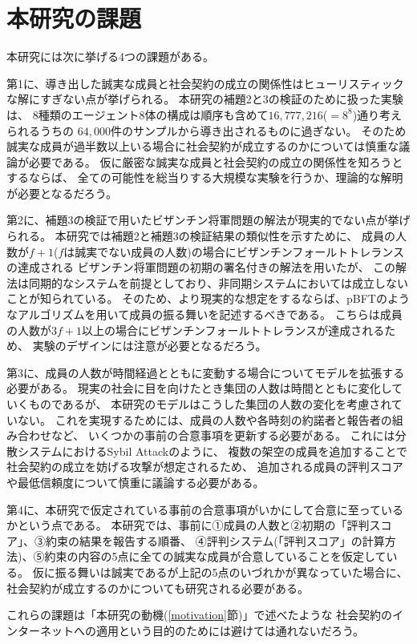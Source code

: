 \section{本研究の課題}
本研究には次に挙げる4つの課題がある。

第1に、導き出した誠実な成員と社会契約の成立の関係性はヒューリスティックな解にすぎない点が挙げられる。
本研究の補題2と3の検証のために扱った実験は、
8種類のエージェント8体の構成は順序も含めて$16,777,216$($=8^8$)通り考えられるうちの
$64,000$件のサンプルから導き出されるものに過ぎない。
そのため誠実な成員が過半数以上いる場合に社会契約が成立するのかについては慎重な議論が必要である。
仮に厳密な誠実な成員と社会契約の成立の関係性を知ろうとするならば、
全ての可能性を総当りする大規模な実験を行うか、理論的な解明が必要となるだろう。

第2に、補題3の検証で用いたビザンチン将軍問題の解法が現実的でない点が挙げられる。
本研究では補題2と補題3の検証結果の類似性を示すために、
成員の人数が$f+1$($f$は誠実でない成員の人数)の場合にビザンチンフォールトトレランスの達成される
ビザンチン将軍問題の初期の署名付きの解法\cite{lamport1982}を用いたが、
この解法は同期的なシステムを前提としており、非同期システムにおいては成立しないことが知られている。\cite{fischer1985}
そのため、より現実的な想定をするならば、pBFTのようなアルゴリズムを用いて成員の振る舞いを記述するべきである。\cite{castro1999}
こちらは成員の人数が$3f+1$以上の場合にビザンチンフォールトトレランスが達成されるため、
実験のデザインには注意が必要となるだろう。

第3に、成員の人数が時間経過とともに変動する場合についてモデルを拡張する必要がある。
現実の社会に目を向けたとき集団の人数は時間とともに変化していくものであるが、
本研究のモデルはこうした集団の人数の変化を考慮されていない。
これを実現するためには、成員の人数や各時刻の約諾者と報告者の組み合わせなど、
いくつかの事前の合意事項を更新する必要がある。
これには分散システムにおけるSybil Attack\cite{douceur2002}のように、
複数の架空の成員を追加することで社会契約の成立を妨げる攻撃が想定されるため、
追加される成員の評判スコアや最低信頼度について慎重に議論する必要がある。

第4に、本研究で仮定されている事前の合意事項がいかにして合意に至っているかという点である。
本研究では、事前に①成員の人数と②初期の「評判スコア」、③約束の結果を報告する順番、
④評判システム(「評判スコア」の計算方法)、⑤約束の内容の5点に全ての誠実な成員が合意していることを仮定している。
仮に振る舞いは誠実であるが上記の5点のいづれかが異なっていた場合に、社会契約が成立するのかについても研究される必要がある。

これらの課題は「本研究の動機(\ref{motivation}節)」で述べたような
社会契約のインターネットへの適用という目的のためには避けては通れないだろう。


